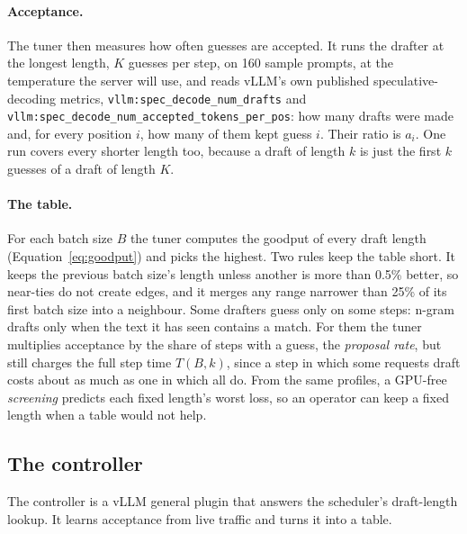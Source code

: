 \documentclass{article}
\newcommand{\term}[1]{\emph{#1}}
\begin{document}
\paragraph{Acceptance.} The tuner then measures how often guesses are accepted. It runs the drafter at the longest length, $K$ guesses per step, on 160 sample prompts, at the temperature the server will use, and reads vLLM's own published speculative-decoding metrics, \texttt{vllm:spec\_decode\_}\allowbreak\texttt{num\_drafts} and \texttt{vllm:spec\_decode\_}\allowbreak\texttt{num\_accepted\_}\allowbreak\texttt{tokens\_per\_pos}: how many drafts were made and, for every position $i$, how many of them kept guess $i$. Their ratio is $a_i$. One run covers every shorter length too, because a draft of length $k$ is just the first $k$ guesses of a draft of length $K$.

\paragraph{The table.} For each batch size $B$ the tuner computes the goodput of every draft length (Equation~\ref{eq:goodput}) and picks the highest. Two rules keep the table short. It keeps the previous batch size's length unless another is more than 0.5\% better, so near-ties do not create edges, and it merges any range narrower than 25\% of its first batch size into a neighbour. Some drafters guess only on some steps: n-gram drafts only when the text it has seen contains a match. For them the tuner multiplies acceptance by the share of steps with a guess, the \term{proposal rate}, but still charges the full step time $T(B,k)$, since a step in which some requests draft costs about as much as one in which all do. From the same profiles, a GPU-free \emph{screening} predicts each fixed length's worst loss, so an operator can keep a fixed length when a table would not help.

\subsection{The controller}
\label{sec:controller}

The controller is a vLLM general plugin that answers the scheduler's draft-length lookup. It learns acceptance from live traffic and turns it into a table.
\end{document}
